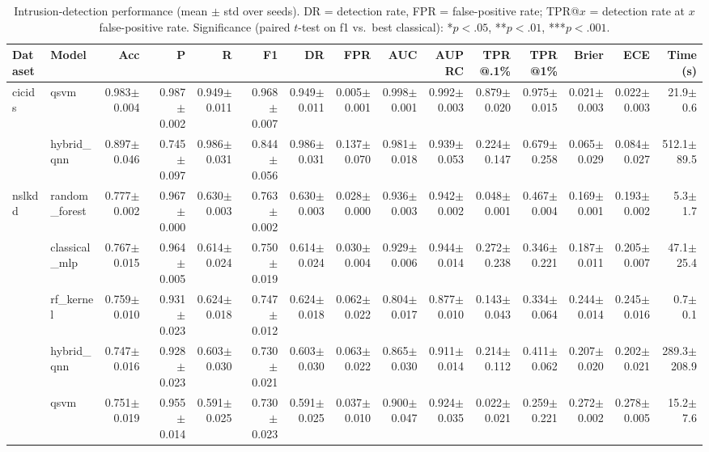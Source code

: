 \begin{table}[t]
\centering
\caption{Intrusion-detection performance (mean $\pm$ std over seeds). DR = detection rate, FPR = false-positive rate; TPR@$x$ = detection rate at $x$ false-positive rate. Significance (paired $t$-test on f1 vs.\ best classical): {*}$p{<}.05$, {**}$p{<}.01$, {***}$p{<}.001$.}
\label{tab:results}
\begin{tabular}{llrrrrrrrrrrrrr}
\toprule
Dataset & Model & Acc & P & R & F1 & DR & FPR & AUC & AUPRC & TPR@.1\% & TPR@1\% & Brier & ECE & Time (s) \\
\midrule
cicids & qsvm & 0.983$\pm$0.004 & 0.987$\pm$0.002 & 0.949$\pm$0.011 & 0.968$\pm$0.007 & 0.949$\pm$0.011 & 0.005$\pm$0.001 & 0.998$\pm$0.001 & 0.992$\pm$0.003 & 0.879$\pm$0.020 & 0.975$\pm$0.015 & 0.021$\pm$0.003 & 0.022$\pm$0.003 & 21.9$\pm$0.6 \\
 & hybrid\_qnn & 0.897$\pm$0.046 & 0.745$\pm$0.097 & 0.986$\pm$0.031 & 0.844$\pm$0.056 & 0.986$\pm$0.031 & 0.137$\pm$0.070 & 0.981$\pm$0.018 & 0.939$\pm$0.053 & 0.224$\pm$0.147 & 0.679$\pm$0.258 & 0.065$\pm$0.029 & 0.084$\pm$0.027 & 512.1$\pm$89.5 \\
nslkdd & random\_forest & 0.777$\pm$0.002 & 0.967$\pm$0.000 & 0.630$\pm$0.003 & 0.763$\pm$0.002 & 0.630$\pm$0.003 & 0.028$\pm$0.000 & 0.936$\pm$0.003 & 0.942$\pm$0.002 & 0.048$\pm$0.001 & 0.467$\pm$0.004 & 0.169$\pm$0.001 & 0.193$\pm$0.002 & 5.3$\pm$1.7 \\
 & classical\_mlp & 0.767$\pm$0.015 & 0.964$\pm$0.005 & 0.614$\pm$0.024 & 0.750$\pm$0.019 & 0.614$\pm$0.024 & 0.030$\pm$0.004 & 0.929$\pm$0.006 & 0.944$\pm$0.014 & 0.272$\pm$0.238 & 0.346$\pm$0.221 & 0.187$\pm$0.011 & 0.205$\pm$0.007 & 47.1$\pm$25.4 \\
 & rf\_kernel & 0.759$\pm$0.010 & 0.931$\pm$0.023 & 0.624$\pm$0.018 & 0.747$\pm$0.012 & 0.624$\pm$0.018 & 0.062$\pm$0.022 & 0.804$\pm$0.017 & 0.877$\pm$0.010 & 0.143$\pm$0.043 & 0.334$\pm$0.064 & 0.244$\pm$0.014 & 0.245$\pm$0.016 & 0.7$\pm$0.1 \\
 & hybrid\_qnn & 0.747$\pm$0.016 & 0.928$\pm$0.023 & 0.603$\pm$0.030 & 0.730$\pm$0.021 & 0.603$\pm$0.030 & 0.063$\pm$0.022 & 0.865$\pm$0.030 & 0.911$\pm$0.014 & 0.214$\pm$0.112 & 0.411$\pm$0.062 & 0.207$\pm$0.020 & 0.202$\pm$0.021 & 289.3$\pm$208.9 \\
 & qsvm & 0.751$\pm$0.019 & 0.955$\pm$0.014 & 0.591$\pm$0.025 & 0.730$\pm$0.023 & 0.591$\pm$0.025 & 0.037$\pm$0.010 & 0.900$\pm$0.047 & 0.924$\pm$0.035 & 0.022$\pm$0.021 & 0.259$\pm$0.221 & 0.272$\pm$0.002 & 0.278$\pm$0.005 & 15.2$\pm$7.6 \\

\end{tabular}
\end{table}
